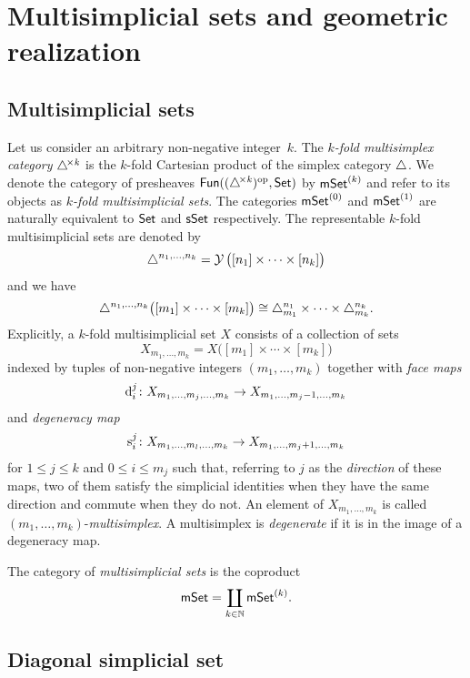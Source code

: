 
\section{Multisimplicial sets and geometric realization}


\subsection{Multisimplicial sets}

Let us consider an arbitrary non-negative integer~$k$.
The \textit{$k$-fold multisimplex category} $\triangle^{\!\times\mathit{k}}$ is the $k$-fold Cartesian product of the simplex category $\triangle$.
We denote the category of presheaves $\mathsf{Fun}((\triangle^{\!\times\mathit{k}})^{\mathrm{op}}, \mathsf{Set})$ by $\mathsf{mSet}^{(k)}$ and refer to its objects as \textit{$k$-fold multisimplicial sets}.
The categories $\mathsf{mSet}^{(0)}$ and $\mathsf{mSet}^{(1)}$ are naturally equivalent to $\mathsf{Set}$ and $\mathsf{sSet}$ respectively.
The representable $k$-fold multisimplicial sets are denoted by
\[
\triangle^{n_1, \dots, n_k} = \operatorname{\mathcal{Y}} \big( [n_1] \times \cdots \times [n_k] \big)
\]
and we have
\[
\triangle^{n_1, \dots, n_k} \big( [m_1] \times \cdots \times [m_k] \big) \cong
\triangle^{n_1}_{m_1} \times \dots \times \triangle^{n_k}_{m_k}.
\]
Explicitly, a $k$-fold multisimplicial set $X$ consists of a collection of sets
\[
X_{m_1, \dots, m_k} = X\big( [m_1] \times \cdots \times [m_k] \big)
\]
indexed by tuples of non-negative integers $(m_1, \dots, m_k)$ together with \textit{face maps}
\[
\operatorname{d}_i^j \colon
X_{m_1, \dots, m_j, \dots, m_k} \to
X_{m_1, \dots, m_j-1, \dots, m_k}
\]
and \textit{degeneracy map}
\[
\operatorname{s}^j_i \colon X_{m_1, \dots, m_l, \dots, m_k} \to X_{m_1, \dots, m_j+1, \dots, m_k}
\]
for $1 \leq j \leq k$ and $0 \leq i \leq m_j$ such that, referring to $j$ as the \textit{direction} of these maps, two of them satisfy the simplicial identities when they have the same direction and commute when they do not.
An element of $X_{m_1, \dots, m_k}$ is called
$(m_1, \dots, m_k)$-\textit{multisimplex}.
A multisimplex is \textit{degenerate} if it is in the image of a degeneracy map.

The category of \textit{multisimplicial sets} is the coproduct
\[
\mathsf{mSet} = \coprod_{k \in \mathbb{N}} \mathsf{mSet}^{(k)}.
\]

\subsection{Diagonal simplicial set} \label{ss:diagonal simplicial set}

